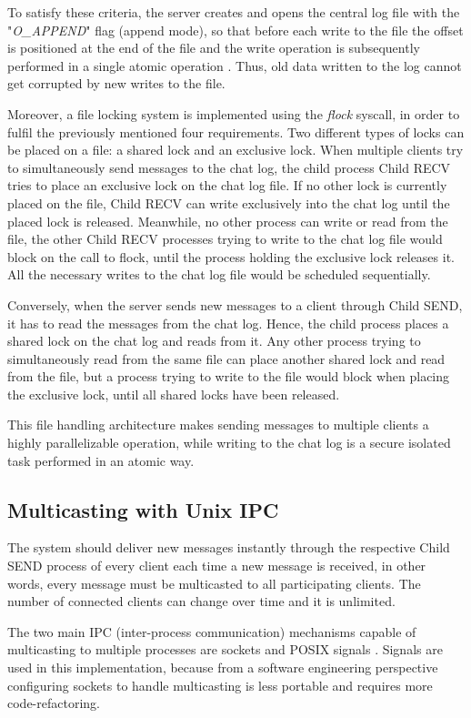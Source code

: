 To satisfy these criteria, the server creates and opens the central log file with the "\textit{O\_APPEND}" flag (append mode), so that before each write to the file the offset is positioned at the end of the file and the write operation is subsequently performed in a single atomic operation \cite{Kerrisk2010}. Thus, old data written to the log cannot get corrupted by new writes to the file.

Moreover, a file locking system is implemented using the \textit{flock} syscall, in order to fulfil the previously mentioned four requirements. Two different types of locks can be placed on a file: a shared lock and an exclusive lock. When multiple clients try to simultaneously send messages to the chat log, the child process Child RECV tries to place an exclusive lock on the chat log file.  If no other lock is currently placed on the file, Child RECV can write exclusively into the chat log until the placed lock is released. Meanwhile, no other process can write or read from the file, the other Child RECV processes trying to write to the chat log file would block on the call to flock, until the process holding the exclusive lock releases it. All the necessary writes to the chat log file would be scheduled sequentially.

Conversely, when the server sends new messages to a client through Child SEND, it has to read the messages from the chat log. Hence, the child process places a shared lock on the chat log and reads from it. Any other process trying to simultaneously read from the same file can place another shared lock and read from the file, but a process trying to write to the file would block when placing the exclusive lock, until all shared locks have been released. 

This file handling architecture makes sending messages to multiple clients a highly parallelizable operation, while writing to the chat log is a secure isolated task performed in an atomic way.

\subsection{Multicasting with Unix IPC}
The system should deliver new messages instantly through the respective Child SEND process of every client each time a new message is received, in other words, every message must be multicasted to all participating clients. The number of connected clients can change over time and it is unlimited. 

The two main IPC (inter-process communication) mechanisms capable of multicasting to multiple processes are sockets and POSIX signals \cite{Kerrisk2010}. Signals are used in this implementation, because from a software engineering perspective configuring sockets to handle multicasting is less portable and requires more code-refactoring.


